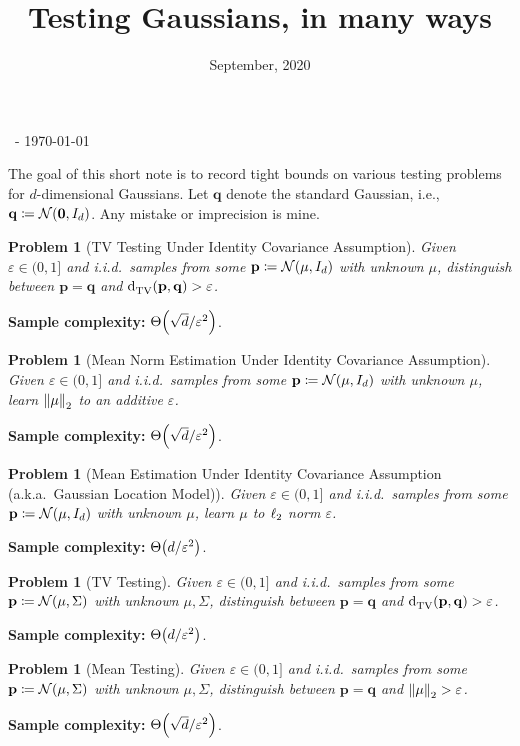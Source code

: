 \documentclass[10pt]{article}
\title{Testing Gaussians, in many ways}
\date{September, 2020}
\newcommand{\dst}{\varepsilon}
\newcommand{\dims}{d}
\newcommand{\p}{\mathbf{p}}
\newcommand{\q}{\mathbf{q}}
\renewcommand{\eqdef}{\coloneqq}
\theoremstyle{plain}
\newtheorem{problem}[theorem]{Problem}
\begin{document}
\begin{flushleft}\sf\footnotesize
\makeatletter
\@date~- \today \hfill \@title
\makeatother
\end{flushleft}
\vspace{5mm}

The goal of this short note is to record tight bounds on various testing problems for $\dims$-dimensional Gaussians. Let $\q$ denote the standard Gaussian, i.e., $\q\eqdef \gaussian{\mathbf{0}}{I_\dims}$. Any mistake or imprecision is mine.
\begin{problem}[TV Testing Under Identity Covariance Assumption]
  \label{problem:tv:identitycov}
  Given $\dst \in(0,1]$ and i.i.d.\ samples from some $\p\eqdef\gaussian{\mu}{I_\dims}$ with unknown $\mu$, distinguish between $\p = \q$ and $\totalvardist{\p}{\q }> \dst$.
\end{problem}
\hfill \textbf{Sample complexity:} $\bigTheta{\sqrt{\dims}/\dst^2}$. 

\begin{problem}[Mean Norm Estimation Under Identity Covariance Assumption]
  \label{problem:mean:identitycov}
  Given $\dst \in(0,1]$ and i.i.d.\ samples from some $\p\eqdef\gaussian{\mu}{I_\dims}$ with unknown $\mu$, learn $\normtwo{\mu}$ to an additive $\dst$.
\end{problem}
\hfill \textbf{Sample complexity:} $\bigTheta{\sqrt{\dims}/\dst^2}$. 

\begin{problem}[Mean Estimation Under Identity Covariance Assumption (a.k.a.\ Gaussian Location Model)]
  \label{problem:mean:identitycov:learn}
  Given $\dst \in(0,1]$ and i.i.d.\ samples from some $\p\eqdef\gaussian{\mu}{I_\dims}$ with unknown $\mu$, learn $\mu$ to $\lp[2]$ norm $\dst$.
\end{problem}
\hfill \textbf{Sample complexity:} $\bigTheta{\dims/\dst^2}$. 

\begin{problem}[TV Testing]
  \label{problem:tv:general}
  Given $\dst \in(0,1]$ and i.i.d.\ samples from some $\p\eqdef\gaussian{\mu}{\Sigma}$ with unknown $\mu,\Sigma$, distinguish between $\p = \q$ and $\totalvardist{\p}{\q }> \dst$.
\end{problem}
\hfill \textbf{Sample complexity:} $\bigTheta{\dims/\dst^2}$. 

\begin{problem}[Mean Testing]
  \label{problem:mean:testing:standard}
  Given $\dst \in(0,1]$ and i.i.d.\ samples from some $\p\eqdef\gaussian{\mu}{\Sigma}$ with unknown $\mu,\Sigma$, distinguish between $\p = \q$ and $\normtwo{\mu} > \dst$.
\end{problem}
\hfill \textbf{Sample complexity:} $\bigTheta{\sqrt{\dims}/\dst^2}$. 
\end{document}
